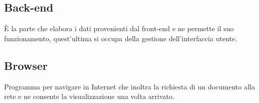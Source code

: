 \documentclass[../glossario.tex]{subfiles}
\begin{document}
\subsection*{Back-end}
È la parte che elabora i dati provenienti dal front-end e ne permette il suo funzionamento, quest'ultima si occupa della gestione dell'interfaccia utente.

\subsection*{Browser}
Programma per navigare in Internet che inoltra la richiesta di un documento alla rete e ne consente la visualizzazione una volta arrivato.
    
\end{document}
